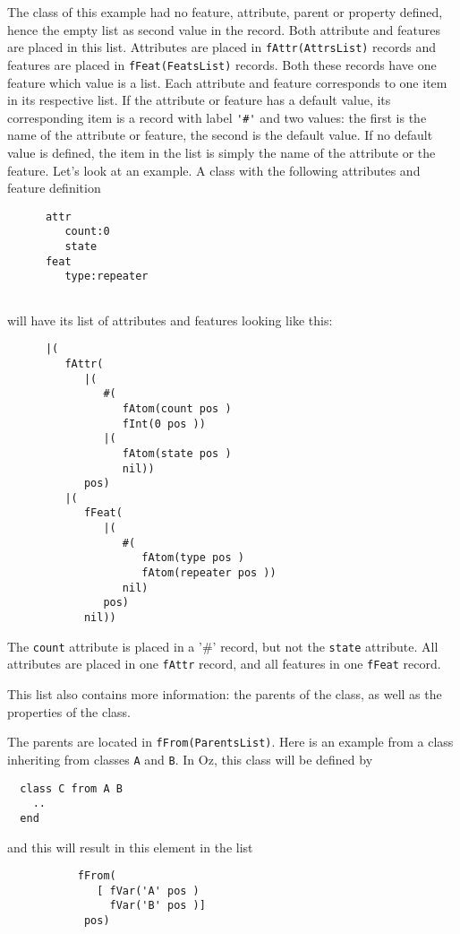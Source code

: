 \documentclass[a4paper]{memoir}
\begin{document}
The class of this example had no feature, attribute, parent or property defined, hence the empty
list as second value in the record.
Both attribute and features are placed in this list. Attributes are placed in
\lstinline!fAttr(AttrsList)! records and features are placed in
\lstinline!fFeat(FeatsList)! records. Both these records have one feature which
value is a list. Each attribute and feature corresponds to one item in its
respective list. If the attribute or feature has a default value, its
corresponding item is a record with label \lstinline!'#'! and two values: the
first is the name of the attribute or feature, the second is the default value.
If no default value is defined, the item in the list is simply the name of the
attribute or the feature.
Let's look at an example. A class with the following attributes and feature
definition
\begin{lstlisting}
      attr
         count:0
         state
      feat
         type:repeater
  
\end{lstlisting}
will have its list of attributes and features looking like this:
\begin{lstlisting}
      |(
         fAttr(
            |(
               #(
                  fAtom(count pos )
                  fInt(0 pos ))
               |(
                  fAtom(state pos )
                  nil))
            pos)
         |(
            fFeat(
               |(
                  #(
                     fAtom(type pos )
                     fAtom(repeater pos ))
                  nil)
               pos)
            nil))
\end{lstlisting}
The \lstinline!count! attribute is placed in a '\#' record, but not
the \lstinline!state! attribute.
All attributes are placed in one \lstinline!fAttr!
record, and all features in one \lstinline!fFeat! record.

This list also contains more information: the parents of the class, as well as
the properties of the class. 

The parents are located in \lstinline!fFrom(ParentsList)!. 
Here is an example from a class inheriting from classes \lstinline!A! and
\lstinline!B!. In Oz, this class will be defined by
\begin{lstlisting}
  class C from A B
    ..
  end
\end{lstlisting}
and this will result in this element in the list
\begin{lstlisting}
           fFrom(
              [ fVar('A' pos )
                fVar('B' pos )]
            pos)
\end{lstlisting}
\end{document}

